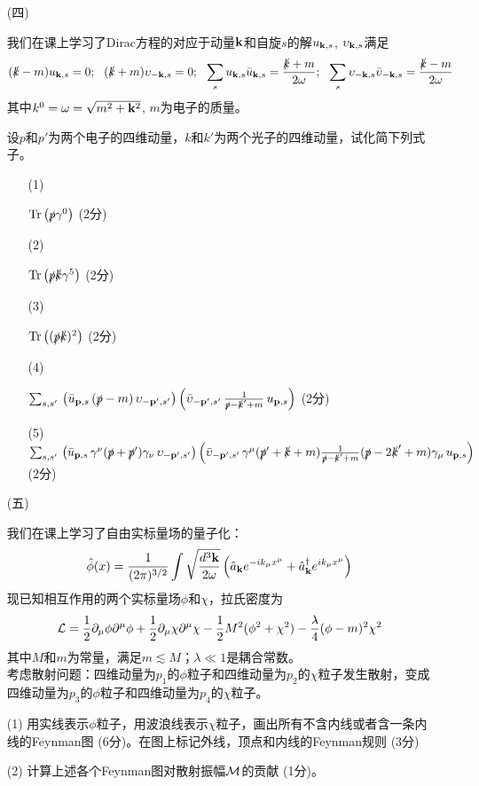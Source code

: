 \documentclass[12pt,CJK]{article}
\def\mark#1{{\color{blue} (#1分)}}
\begin{document}
{\vskip 0.1in}

\begin{itemize}
\item[(四)]{
我们在课上学习了Dirac方程的对应于动量${\mathbf{k}}$和自旋$s$的解$u_{{\mathbf{k}}, s}$, $\upsilon_{{\mathbf{k}},s}$满足
$$(\slk-m)u_{\veck,s} = 0;\ \ (\slk+m)\upsilon_{-\veck,s} = 0;\ \  \sum_s u_{\veck,s}\bar{u}_{\veck,s} = \frac{\slashed{k}+m}{2\omega}; \ \ \sum_s \upsilon_{-\veck,s}\bar{\upsilon}_{-\veck,s} = \frac{\slashed{k}-m}{2\omega}$$
其中$k^0 = \omega = \sqrt{m^2+{\mathbf{k}}^2}$, $m$为电子的质量。

设$p$和$p'$为两个电子的四维动量，$k$和$k'$为两个光子的四维动量，试化简下列式子。
\begin{itemize}
\item[(1)]{$\mathrm{Tr}\left(\slashed{p}\gamma^0\right)$ \mark{2}

\vspace{0.7in}
}

\item[(2)]{$\mathrm{Tr}\left(\slashed{p}\slashed{k}\gamma^5\right)$ \mark{2}

\vspace{0.7in}
}
\item[(3)]{$\mathrm{Tr}\left((\slashed{p}\slashed{k})^2\right)$ \mark{2}

\vspace{1.in}
}
\item[(4)]{$\sum_{s,s'}\, \left(\bar{u}_{{\mathbf{p}},s}\, (\slashed{p}-m) \, \upsilon_{-{\mathbf{p}}',s'} \right)\left(\bar{\upsilon}_{-{\mathbf{p}}',s'}\,\frac{1}{\slashed{p} - \slashed{k}'+m}\, u_{{\mathbf{p}},s}\right)$ \mark{2}

\vspace{1.6in}
}
\item[(5)]{$\sum_{s,s'}\, \left(\bar{u}_{{\mathbf{p}},s}\, \gamma^\nu(\slashed{p}+\slashed{p}')\gamma_\nu \,\upsilon_{-{\mathbf{p}}',s'} \right)\left(\bar{\upsilon}_{-{\mathbf{p}}',s'}\,\gamma^\mu(\slashed{p}'+\slashed{k}+m)\frac{1}{\slashed{p} - \slashed{k}'+m}(\slashed{p}- 2\slashed{k}'+m)\gamma_\mu\, u_{{\mathbf{p}},s}\right)$ \mark{2}
}
\end{itemize}
}
\end{itemize}

\clearpage

\begin{itemize}
\item[(五)]{
我们在课上学习了自由实标量场的量子化：
$${\hat{\phi}}(x) = \frac{1}{(2\pi)^{3/2}} \int \sqrt{\frac{d^3{\mathbf{k}}}{2\omega}} \left({\hat{a}}_{{\mathbf{k}}} e^{-ik_\mu x^\mu} + {\hat{a}^\dagger}_{{\mathbf{k}}}e^{ik_\mu x^\mu}\right) $$
现已知相互作用的两个实标量场$\phi$和$\chi$，拉氏密度为
$${\mathcal{L}} = \frac{1}{2}\partial_\mu\phi\partial^\mu\phi + \frac{1}{2}\partial_\mu\chi\partial^\mu\chi - \frac{1}{2} M^2 (\phi^2 + \chi^2) -\frac{\lambda}{4} (\phi- m)^2\chi^2 $$
其中$M$和$m$为常量，满足$m\lesssim M$；$\lambda\ll 1$是耦合常数。\\
考虑散射问题：四维动量为$p_1$的$\phi$粒子和四维动量为$p_2$的$\chi$粒子发生散射，变成四维动量为$p_3$的$\phi$粒子和四维动量为$p_4$的$\chi$粒子。

(1) 用实线表示$\phi$粒子，用波浪线表示$\chi$粒子，画出所有不含内线或者含一条内线的Feynman图 \mark{6}。在图上标记外线，顶点和内线的Feynman规则 \mark{3}

\vspace{3.1in}

(2) 计算上述各个Feynman图对散射振幅${\mathcal{M}}$的贡献 \mark{1}。
}
\end{itemize}
\ech
\end{document}
